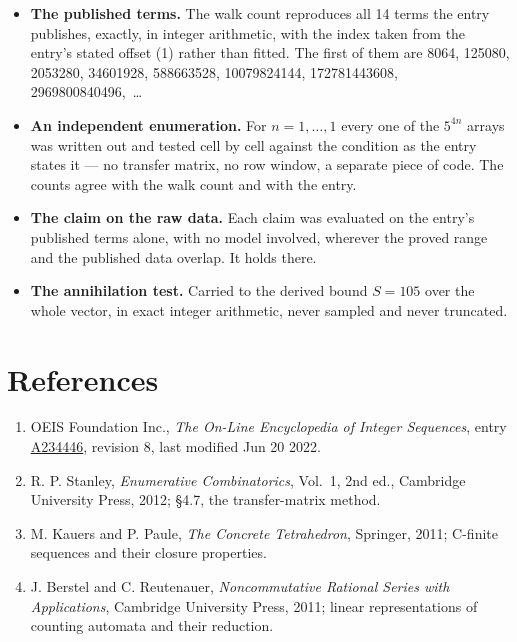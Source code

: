 \documentclass[11pt]{article}
\theoremstyle{definition}
\begin{document}
\begin{itemize}

\item {\bfseries The published terms.} The walk count reproduces all 14 terms the entry publishes, exactly, in integer arithmetic, with the index taken from the entry's stated offset (1) rather than fitted. The first of them are 8064, 125080, 2053280, 34601928, 588663528, 10079824144, 172781443608, 2969800840496,~\dots

\item {\bfseries An independent enumeration.} For $n = 1,\dots,1$ every one of the $5^{4n}$ arrays was written out and tested cell by cell against the condition as the entry states it --- no transfer matrix, no row window, a separate piece of code. The counts agree with the walk count and with the entry.

\item {\bfseries The claim on the raw data.} Each claim was evaluated on the entry's published terms alone, with no model involved, wherever the proved range and the published data overlap. It holds there.

\item {\bfseries The annihilation test.} Carried to the derived bound $S = 105$ over the whole vector, in exact integer arithmetic, never sampled and never truncated.

\end{itemize}

\section{References}

\begin{enumerate}

\item OEIS Foundation Inc., \emph{The On-Line Encyclopedia of Integer Sequences}, entry \href{https://oeis.org/A234446}{A234446}, revision 8, last modified Jun 20 2022.

\item R. P. Stanley, \emph{Enumerative Combinatorics}, Vol.~1, 2nd ed., Cambridge University Press, 2012; \S4.7, the transfer-matrix method.

\item M. Kauers and P. Paule, \emph{The Concrete Tetrahedron}, Springer, 2011; C-finite sequences and their closure properties.

\item J. Berstel and C. Reutenauer, \emph{Noncommutative Rational Series with Applications}, Cambridge University Press, 2011; linear representations of counting automata and their reduction.

\end{enumerate}
\end{document}
